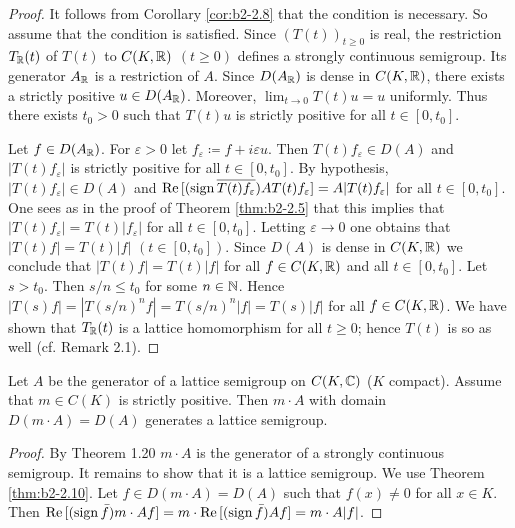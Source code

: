 \begin{proof}
It follows from  Corollary \ref{cor:b2-2.8} that the condition is necessary.
So assume that the condition is satisfied.
Since $(T(t))_{t \geq 0}$ is real, the restriction $T_{\mathbb{R}}(t)$ of $T(t)$ to $C(K,\mathbb{R})$ $(t \geq 0)$ defines a strongly continuous semigroup.
Its generator $A_{\mathbb{R}}$ is a restriction of $A$.
Since $D(A_{\mathbb{R}})$ is dense in $C(K,\mathbb{R})$, there exists a strictly positive
$u \in D(A_{\mathbb{R}})$.
Moreover, $\lim_{t \to 0} T(t)u = u$ uniformly.
Thus there exists $t_{0} > 0$ such that $T(t)u$ is strictly positive for all $t \in [0,t_{0}]$.

Let $f \in D(A_{\mathbb{R}})$.
For $\varepsilon > 0$ let $f_{\varepsilon} \coloneqq f + i\varepsilon u$.
Then $T(t)f_{\varepsilon} \in D(A)$ and $|T(t)f_{\varepsilon}|$ is strictly positive for all $t \in [0,t_{0}]$.
By hypothesis, $|T(t)f_{\varepsilon}| \in D(A)$ and $\mathop{}\!\mathrm{Re}\,[(\operatorname{sign} \overline{T(t)f_{\varepsilon}})AT(t)f_{\varepsilon}] = A|T(t)f_{\varepsilon}|$ for all $t \in [0,t_{0}]$.
One sees as in the proof of Theorem \ref{thm:b2-2.5} that this implies that $|T(t)f_{\varepsilon}| = T(t)|f_{\varepsilon}|$ for all $t \in [0,t_{0}]$.
Letting $\varepsilon \to 0$ one obtains that $|T(t)f| = T(t)|f|$ $(t \in [0,t_{0}])$.
Since $D(A)$ is dense in $C(K,\mathbb{R})$ we conclude that $|T(t)f| = T(t)|f|$ for all $f \in C(K,\mathbb{R})$ and all $t \in [0,t_{0}]$.
Let $s > t_{0}$.
Then $s/n \leq t_{0}$ for some $n \in \mathbb{N}$.
Hence $|T(s)f| = |T(s/n)^{n}f| = T(s/n)^{n}|f| = T(s)|f|$ for all $f \in C(K,\mathbb{R})$.
We have shown that $T_{\mathbb{R}}(t)$ is a lattice homomorphism for all $t \geq 0$; hence $T(t)$ is so as well (cf. Remark 2.1).
\end{proof}

\begin{corollary}\label{cor:b2-2.11}
Let $A$ be the generator of a lattice semigroup on $C(K,\mathbb{C})$ ($K$ compact).
Assume that $m \in C(K)$ is strictly positive.
Then $m \cdot A$ with domain $D(m \cdot A) = D(A)$ generates a lattice semigroup.
\end{corollary}

\begin{proof}
By Theorem 1.20 $m \cdot A$ is the generator of a strongly continuous semigroup.
It remains to show that it is a lattice semigroup.
We use Theorem \ref{thm:b2-2.10}.
Let $f \in D(m \cdot A) = D(A)$ such that $f(x) \neq 0$ for all $x \in K$.
Then $\mathop{}\!\mathrm{Re}\,[(\operatorname{sign} \bar{f})m \cdot Af] = m \cdot \mathop{}\!\mathrm{Re}\,[(\operatorname{sign} \bar{f})Af] = m \cdot A|f|$.
\end{proof}

